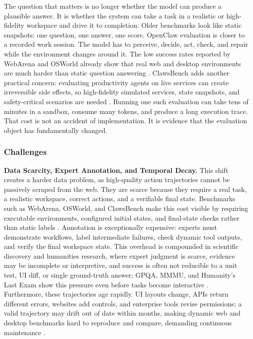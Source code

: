 \begin{itemize}
\end{itemize}

The question that matters is no longer whether the model can produce a plausible answer. It is whether the system can take a task in a realistic or high-fidelity workspace and drive it to completion. Older benchmarks look like static snapshots: one question, one answer, one score. OpenClaw evaluation is closer to a recorded work session. The model has to perceive, decide, act, check, and repair while the environment changes around it. The low success rates reported by WebArena and OSWorld already show that real web and desktop environments are much harder than static question answering \citep{zhou2023webarena,xie2024osworld}. ClawsBench adds another practical concern: evaluating productivity agents on live services can create irreversible side effects, so high-fidelity simulated services, state snapshots, and safety-critical scenarios are needed \citep{li2026clawsbench}. Running one such evaluation can take tens of minutes in a sandbox, consume many tokens, and produce a long execution trace. That cost is not an accident of implementation. It is evidence that the evaluation object has fundamentally changed.


\subsubsection*{Challenges}


\textbf{Data Scarcity, Expert Annotation, and Temporal Decay.} This shift creates a harder data problem, as high-quality action trajectories cannot be passively scraped from the web. They are scarce because they require a real task, a realistic workspace, correct actions, and a verifiable final state. Benchmarks such as WebArena, OSWorld, and ClawsBench make this cost visible by requiring executable environments, configured initial states, and final-state checks rather than static labels \citep{zhou2023webarena,xie2024osworld,li2026clawsbench}. Annotation is exceptionally expensive: experts must demonstrate workflows, label intermediate failures, check dynamic tool outputs, and verify the final workspace state. This overhead is compounded in scientific discovery and humanities research, where expert judgment is scarce, evidence may be incomplete or interpretive, and success is often not reducible to a unit test, UI diff, or single ground-truth answer; GPQA, MMMU, and Humanity's Last Exam show this pressure even before tasks become interactive \citep{rein2023gpqa,yue2023mmmu,phan2025hle}. Furthermore, these trajectories age rapidly. UI layouts change, APIs return different errors, websites add controls, and enterprise tools revise permissions; a valid trajectory may drift out of date within months, making dynamic web and desktop benchmarks hard to reproduce and compare, demanding continuous maintenance \citep{deng2023mind2web,zhou2023webarena,xie2024osworld}.

